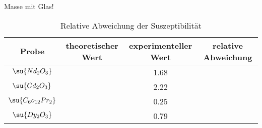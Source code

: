 Masse mit Glas!
\begin{table}
  \centering
  \begin{tabular}{c c c c}
    \toprule
     Probe & theoretischer Wert & experimenteller Wert & relative Abweichung \\
     \midrule
     $\su{Nd_2O_3}$       &   & 1.68 \\
     $\su{Gd_2O_3}$       &   & 2.22 \\
     $\su{C_6o_{12}Pr_2}$ &   & 0.25 \\
     $\su{Dy_2O_3}$       &   & 0.79 \\
     \bottomrule
  \end{tabular}
  \caption{Relative Abweichung der Suszeptibilität}
  \label{tab:rel}
\end{table}
